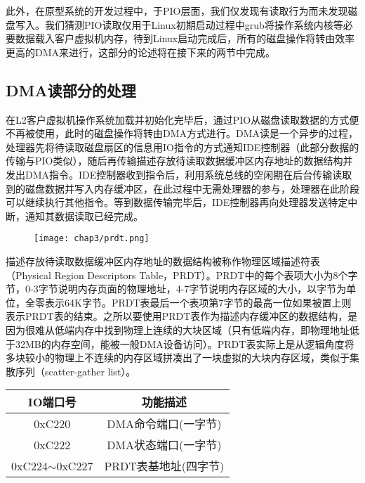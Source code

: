 此外，在原型系统的开发过程中，于PIO层面，我们仅发现有读取行为而未发现磁盘写入。我们猜测PIO读取仅用于Linux初期启动过程中grub将操作系统内核等必要数据载入客户虚拟机内存，待到Linux启动完成后，所有的磁盘操作将转由效率更高的DMA来进行，这部分的论述将在接下来的两节中完成。

\subsection{DMA读部分的处理}

在L2客户虚拟机操作系统加载并初始化完毕后，通过PIO从磁盘读取数据的方式便不再被使用，此时的磁盘操作将转由DMA方式进行。DMA读是一个异步的过程，处理器先将待读取磁盘扇区的信息用IO指令的方式通知IDE控制器（此部分数据的传输与PIO类似），随后再传输描述存放待读取数据缓冲区内存地址的数据结构并发出DMA指令。IDE控制器收到指令后，利用系统总线的空闲期在后台传输读取到的磁盘数据并写入内存缓冲区，在此过程中无需处理器的参与，处理器在此阶段可以继续执行其他指令。等到数据传输完毕后，IDE控制器再向处理器发送特定中断，通知其数据读取已经完成。

\begin{figure}[!htbp]
  \centering
  \texttt{[image: chap3/prdt.png]}
\end{figure}

描述存放待读取数据缓冲区内存地址的数据结构被称作物理区域描述符表（Physical Region Descriptors Table，PRDT）。PRDT中的每个表项大小为8个字节，0-3字节说明内存页面的物理地址，4-7字节说明内存区域的大小，以字节为单位，全零表示64K字节。PRDT表最后一个表项第7字节的最高一位如果被置上则表示PRDT表的结束。之所以要使用PRDT表作为描述内存缓冲区的数据结构，是因为很难从低端内存中找到物理上连续的大块区域（只有低端内存，即物理地址低于32MB的内存空间，能被一般DMA设备访问）。PRDT表实际上是从逻辑角度将多块较小的物理上不连续的内存区域拼凑出了一块虚拟的大块内存区域，类似于集散序列（scatter-gather list）。

\begin{table}[htpb]
\centering
\begin{tabular}{cc}
\toprule
IO端口号	& 功能描述\\
\midrule
0xC220	&DMA命令端口(一字节)\\
0xC222	&DMA状态端口(一字节)\\
0xC224$\sim$0xC227 &PRDT表基地址(四字节)\\
\bottomrule
\end{tabular}
\end{table}

